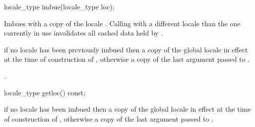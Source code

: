 %
%
\begin{itemdecl}
locale_type imbue(locale_type loc); 
\end{itemdecl}

\begin{itemdescr}
\pnum
\effects  Imbues  with a copy of the
locale . \enternote Calling  with a
different locale than the one currently in use invalidates all cached
data held by . \exitnote

\pnum
\returns  if no locale has been previously imbued then a copy of the
global locale in effect at the time of construction of ,
otherwise a copy of the last argument passed to .

\pnum
\postcondition  {}.
\end{itemdescr}

%
%
\begin{itemdecl}
locale_type getloc() const;
\end{itemdecl}

\begin{itemdescr}
\pnum
\returns  if no locale has been imbued then a copy of the global locale
in effect at the time of construction of , otherwise a copy of
the last argument passed to .
\end{itemdescr}

